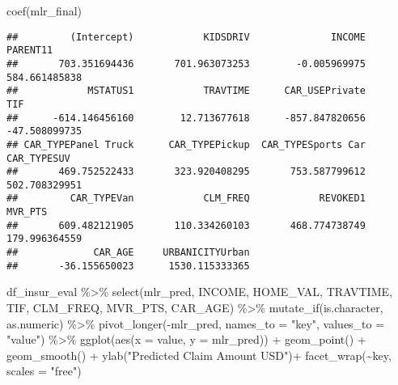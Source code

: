 \documentclass[
]{article}
\newenvironment{Shaded}{\begin{snugshade}}{\end{snugshade}}
\newcommand{\AttributeTok}[1]{\textcolor[rgb]{0.77,0.63,0.00}{#1}}
\newcommand{\DecValTok}[1]{\textcolor[rgb]{0.00,0.00,0.81}{#1}}
\newcommand{\FunctionTok}[1]{\textcolor[rgb]{0.00,0.00,0.00}{#1}}
\newcommand{\NormalTok}[1]{#1}
\newcommand{\OtherTok}[1]{\textcolor[rgb]{0.56,0.35,0.01}{#1}}
\newcommand{\SpecialCharTok}[1]{\textcolor[rgb]{0.00,0.00,0.00}{#1}}
\newcommand{\StringTok}[1]{\textcolor[rgb]{0.31,0.60,0.02}{#1}}
\begin{document}
\begin{Shaded}
\end{Shaded}

\begin{Shaded}
\begin{Highlighting}[]
\FunctionTok{coef}\NormalTok{(mlr\_final)}
\end{Highlighting}
\end{Shaded}

\begin{verbatim}
##         (Intercept)            KIDSDRIV              INCOME            PARENT11 
##       703.351694436       701.963073253        -0.005969975       584.661485838 
##            MSTATUS1            TRAVTIME      CAR_USEPrivate                 TIF 
##      -614.146456160        12.713677618      -857.847820656       -47.508099735 
## CAR_TYPEPanel Truck      CAR_TYPEPickup  CAR_TYPESports Car         CAR_TYPESUV 
##       469.752522433       323.920408295       753.587799612       502.708329951 
##         CAR_TYPEVan            CLM_FREQ            REVOKED1             MVR_PTS 
##       609.482121905       110.334260103       468.774738749       179.996364559 
##             CAR_AGE     URBANICITYUrban 
##       -36.155650023      1530.115333365
\end{verbatim}

\begin{Shaded}
\begin{Highlighting}[]
\NormalTok{df\_insur\_eval }\SpecialCharTok{\%\textgreater{}\%} 
  \FunctionTok{select}\NormalTok{(mlr\_pred, INCOME, HOME\_VAL, TRAVTIME, TIF, CLM\_FREQ, MVR\_PTS,}
\NormalTok{         CAR\_AGE) }\SpecialCharTok{\%\textgreater{}\%}
  \FunctionTok{mutate\_if}\NormalTok{(is.character, as.numeric) }\SpecialCharTok{\%\textgreater{}\%} 
  \FunctionTok{pivot\_longer}\NormalTok{(}\SpecialCharTok{{-}}\NormalTok{mlr\_pred, }\AttributeTok{names\_to =} \StringTok{"key"}\NormalTok{, }\AttributeTok{values\_to =} \StringTok{"value"}\NormalTok{) }\SpecialCharTok{\%\textgreater{}\%}  
  \FunctionTok{ggplot}\NormalTok{(}\FunctionTok{aes}\NormalTok{(}\AttributeTok{x =}\NormalTok{ value, }\AttributeTok{y =}\NormalTok{ mlr\_pred)) }\SpecialCharTok{+} 
  \FunctionTok{geom\_point}\NormalTok{() }\SpecialCharTok{+} 
  \FunctionTok{geom\_smooth}\NormalTok{() }\SpecialCharTok{+}
  \FunctionTok{ylab}\NormalTok{(}\StringTok{"Predicted Claim Amount USD"}\NormalTok{)}\SpecialCharTok{+}
  \FunctionTok{facet\_wrap}\NormalTok{(}\SpecialCharTok{\textasciitilde{}}\NormalTok{key, }\AttributeTok{scales =} \StringTok{"free"}\NormalTok{)}
\end{Highlighting}
\end{Shaded}
\end{document}
